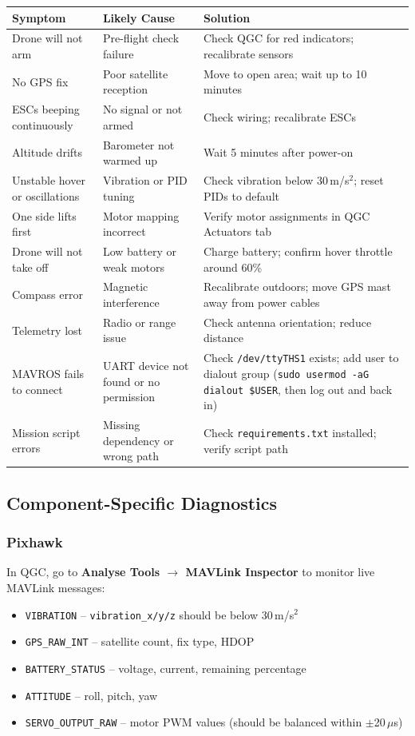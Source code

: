 \documentclass{article}
\begin{document}
\begin{longtable}{p{3.8cm}p{4.2cm}p{5.5cm}}
\toprule
\textbf{Symptom} & \textbf{Likely Cause} & \textbf{Solution} \\
\midrule
\endhead
Drone will not arm & Pre-flight check failure & Check QGC for red indicators; recalibrate sensors \\
No GPS fix & Poor satellite reception & Move to open area; wait up to 10 minutes \\
ESCs beeping continuously & No signal or not armed & Check wiring; recalibrate ESCs \\
Altitude drifts & Barometer not warmed up & Wait 5 minutes after power-on \\
Unstable hover or oscillations & Vibration or PID tuning & Check vibration below 30\,m/s$^2$; reset PIDs to default \\
One side lifts first & Motor mapping incorrect & Verify motor assignments in QGC Actuators tab \\
Drone will not take off & Low battery or weak motors & Charge battery; confirm hover throttle around 60\% \\
Compass error & Magnetic interference & Recalibrate outdoors; move GPS mast away from power cables \\
Telemetry lost & Radio or range issue & Check antenna orientation; reduce distance \\
MAVROS fails to connect & UART device not found or no permission & Check \texttt{/dev/ttyTHS1} exists; add user to dialout group (\texttt{sudo usermod -aG dialout \$USER}, then log out and back in) \\
Mission script errors & Missing dependency or wrong path & Check \texttt{requirements.txt} installed; verify script path \\
\bottomrule
\end{longtable}

\subsection{Component-Specific Diagnostics}

\subsubsection{Pixhawk}

In QGC, go to \textbf{Analyse Tools $\rightarrow$ MAVLink Inspector} to monitor live MAVLink messages:

\begin{itemize}
    \item \texttt{VIBRATION} -- \texttt{vibration\_x/y/z} should be below 30\,m/s$^2$
    \item \texttt{GPS\_RAW\_INT} -- satellite count, fix type, HDOP
    \item \texttt{BATTERY\_STATUS} -- voltage, current, remaining percentage
    \item \texttt{ATTITUDE} -- roll, pitch, yaw
    \item \texttt{SERVO\_OUTPUT\_RAW} -- motor PWM values (should be balanced within $\pm$20\,$\mu$s)
\end{itemize}
\end{document}
